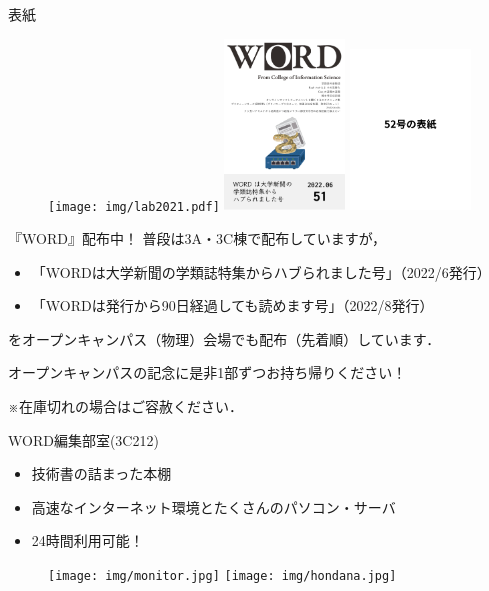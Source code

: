 \documentclass[lualatex]{beamer}
\begin{document}
\begin{frame}[plain]{表紙}
 \begin{figure}
  \centering
  \texttt{[image: img/lab2021.pdf]}
  \includegraphics[width=32mm]{img/word51.pdf}
  \includegraphics[width=32mm]{img/word52.pdf}
 \end{figure}
\end{frame}
\begin{frame}[plain]{『WORD』配布中！}
 普段は3A・3C棟で配布していますが，
\begin{itemize}
 \item 「WORDは大学新聞の学類誌特集からハブられました号」（2022/6発行）
 \item 「WORDは発行から90日経過しても読めます号」（2022/8発行）
\end{itemize}
を\alert{オープンキャンパス（物理）会場でも配布}（先着順）しています．

オープンキャンパスの記念に是非1部ずつお持ち帰りください！

※在庫切れの場合はご容赦ください．
\end{frame}
\begin{frame}[plain]{WORD編集部室(3C212)}
 \begin{itemize}
  \item 技術書の詰まった本棚
  \item 高速なインターネット環境とたくさんのパソコン・サーバ
  \item 24時間利用可能！
 \end{itemize}
\begin{figure}
 \centering
 \texttt{[image: img/monitor.jpg]}
 \texttt{[image: img/hondana.jpg]}
\end{figure}
\end{frame}
\end{document}
